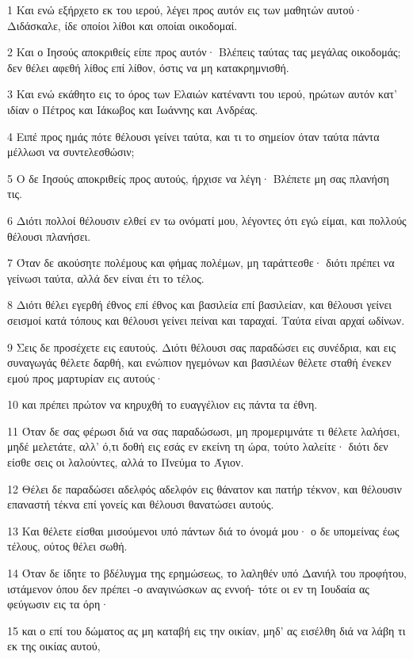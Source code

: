 \par 1 Και ενώ εξήρχετο εκ του ιερού, λέγει προς αυτόν εις των μαθητών αυτού· Διδάσκαλε, ίδε οποίοι λίθοι και οποίαι οικοδομαί.
\par 2 Και ο Ιησούς αποκριθείς είπε προς αυτόν· Βλέπεις ταύτας τας μεγάλας οικοδομάς; δεν θέλει αφεθή λίθος επί λίθον, όστις να μη κατακρημνισθή.
\par 3 Και ενώ εκάθητο εις το όρος των Ελαιών κατέναντι του ιερού, ηρώτων αυτόν κατ' ιδίαν ο Πέτρος και Ιάκωβος και Ιωάννης και Ανδρέας.
\par 4 Ειπέ προς ημάς πότε θέλουσι γείνει ταύτα, και τι το σημείον όταν ταύτα πάντα μέλλωσι να συντελεσθώσιν;
\par 5 Ο δε Ιησούς αποκριθείς προς αυτούς, ήρχισε να λέγη· Βλέπετε μη σας πλανήση τις.
\par 6 Διότι πολλοί θέλουσιν ελθεί εν τω ονόματί μου, λέγοντες ότι εγώ είμαι, και πολλούς θέλουσι πλανήσει.
\par 7 Όταν δε ακούσητε πολέμους και φήμας πολέμων, μη ταράττεσθε· διότι πρέπει να γείνωσι ταύτα, αλλά δεν είναι έτι το τέλος.
\par 8 Διότι θέλει εγερθή έθνος επί έθνος και βασιλεία επί βασιλείαν, και θέλουσι γείνει σεισμοί κατά τόπους και θέλουσι γείνει πείναι και ταραχαί. Ταύτα είναι αρχαί ωδίνων.
\par 9 Σεις δε προσέχετε εις εαυτούς. Διότι θέλουσι σας παραδώσει εις συνέδρια, και εις συναγωγάς θέλετε δαρθή, και ενώπιον ηγεμόνων και βασιλέων θέλετε σταθή ένεκεν εμού προς μαρτυρίαν εις αυτούς·
\par 10 και πρέπει πρώτον να κηρυχθή το ευαγγέλιον εις πάντα τα έθνη.
\par 11 Όταν δε σας φέρωσι διά να σας παραδώσωσι, μη προμεριμνάτε τι θέλετε λαλήσει, μηδέ μελετάτε, αλλ' ό,τι δοθή εις εσάς εν εκείνη τη ώρα, τούτο λαλείτε· διότι δεν είσθε σεις οι λαλούντες, αλλά το Πνεύμα το Άγιον.
\par 12 Θέλει δε παραδώσει αδελφός αδελφόν εις θάνατον και πατήρ τέκνον, και θέλουσιν επαναστή τέκνα επί γονείς και θέλουσι θανατώσει αυτούς.
\par 13 Και θέλετε είσθαι μισούμενοι υπό πάντων διά το όνομά μου· ο δε υπομείνας έως τέλους, ούτος θέλει σωθή.
\par 14 Όταν δε ίδητε το βδέλυγμα της ερημώσεως, το λαληθέν υπό Δανιήλ του προφήτου, ιστάμενον όπου δεν πρέπει -ο αναγινώσκων ας εννοή- τότε οι εν τη Ιουδαία ας φεύγωσιν εις τα όρη·
\par 15 και ο επί του δώματος ας μη καταβή εις την οικίαν, μηδ' ας εισέλθη διά να λάβη τι εκ της οικίας αυτού,
